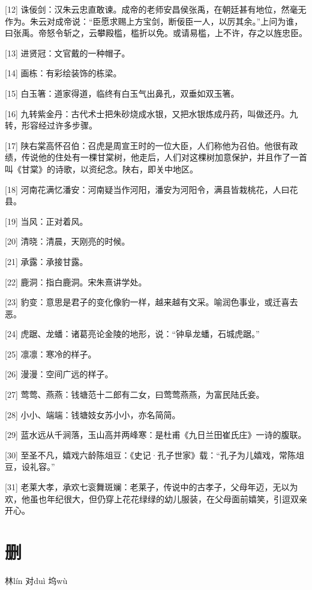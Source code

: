 \documentclass[12pt,UTF8]{ctexbook}
\begin{document}
[12] 诛佞剑：汉朱云忠直敢谏。成帝的老师安昌侯张禹，在朝廷甚有地位，然毫无作为。朱云对成帝说：“臣愿求赐上方宝剑，断佞臣一人，以厉其余。”上问为谁，曰张禹。帝怒令斩之，云攀殿槛，槛折以免。或请易槛，上不许，存之以旌忠臣。

[13] 进贤冠：文官戴的一种帽子。

[14] 画栋：有彩绘装饰的栋梁。

[15] 白玉箸：道家得道，临终有白玉气出鼻孔，双垂如双玉箸。

[16] 九转紫金丹：古代术士把朱砂烧成水银，又把水银炼成丹药，叫做还丹。九转，形容经过许多步骤。

[17] 陕右棠高怀召伯：召虎是周宣王时的一位大臣，人们称他为召伯。他很有政绩，传说他的住处有一棵甘棠树，他走后，人们对这棵树加意保护，并且作了一首叫《甘棠》的诗歌，以资纪念。陕右，即关中地区。

[18] 河南花满忆潘安：河南疑当作河阳，潘安为河阳令，满县皆栽桃花，人曰花县。

[19] 当风：正对着风。

[20] 清晓：清晨，天刚亮的时候。

[21] 承露：承接甘露。

[22] 鹿洞：指白鹿洞。宋朱熹讲学处。

[23] 豹变：意思是君子的变化像豹一样，越来越有文采。喻润色事业，或迁喜去恶。

[24] 虎踞、龙蟠：诸葛亮论金陵的地形，说：“钟阜龙蟠，石城虎踞。”

[25] 凛凛：寒冷的样子。

[26] 漫漫：空间广远的样子。

[27] 莺莺、燕燕：钱塘范十二郎有二女，曰莺莺燕燕，为富民陆氏妾。

[28] 小小、端端：钱塘妓女苏小小，亦名简简。

[29] 蓝水远从千涧落，玉山高并两峰寒：是杜甫《九日兰田崔氏庄》一诗的腹联。

[30] 至圣不凡，嬉戏六龄陈俎豆：《史记·孔子世家》载：“孔子为儿嬉戏，常陈俎豆，设礼容。”

[31] 老莱大孝，承欢七衮舞斑斓：老莱子，传说中的古孝子，父母年迈，无以为欢，他虽也年纪很大，但仍穿上花花绿绿的幼儿服装，在父母面前嬉笑，引逗双亲开心。





\chapter{删}


林lín 对duì 坞wù
\end{document}
